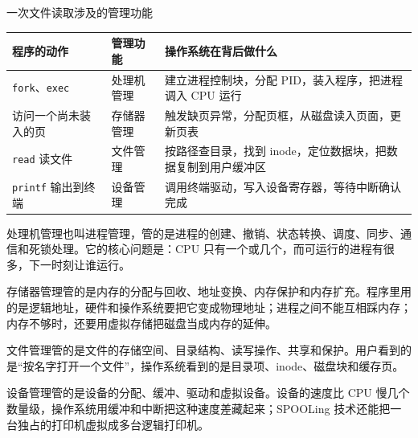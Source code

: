 \begin{tablebox}{一次文件读取涉及的管理功能}
\centering
\small
\begin{tabularx}{\linewidth}{|p{3.1cm}|p{2.2cm}|X|}
\hline
程序的动作 & 管理功能 & 操作系统在背后做什么 \\
\hline
\texttt{fork}、\texttt{exec} & 处理机管理 & 建立进程控制块，分配 PID，装入程序，把进程调入 CPU 运行 \\
\hline
访问一个尚未装入的页 & 存储器管理 & 触发缺页异常，分配页框，从磁盘读入页面，更新页表 \\
\hline
\texttt{read} 读文件 & 文件管理 & 按路径查目录，找到 inode，定位数据块，把数据复制到用户缓冲区 \\
\hline
\texttt{printf} 输出到终端 & 设备管理 & 调用终端驱动，写入设备寄存器，等待中断确认完成 \\
\hline
\end{tabularx}
\end{tablebox}

处理机管理也叫进程管理，管的是进程的创建、撤销、状态转换、调度、同步、通信和死锁处理。它的核心问题是：CPU 只有一个或几个，而可运行的进程有很多，下一时刻让谁运行。

存储器管理管的是内存的分配与回收、地址变换、内存保护和内存扩充。程序里用的是逻辑地址，硬件和操作系统要把它变成物理地址；进程之间不能互相踩内存；内存不够时，还要用虚拟存储把磁盘当成内存的延伸。

文件管理管的是文件的存储空间、目录结构、读写操作、共享和保护。用户看到的是“按名字打开一个文件”，操作系统看到的是目录项、inode、磁盘块和缓存页。

设备管理管的是设备的分配、缓冲、驱动和虚拟设备。设备的速度比 CPU 慢几个数量级，操作系统用缓冲和中断把这种速度差藏起来；SPOOLing 技术还能把一台独占的打印机虚拟成多台逻辑打印机。

